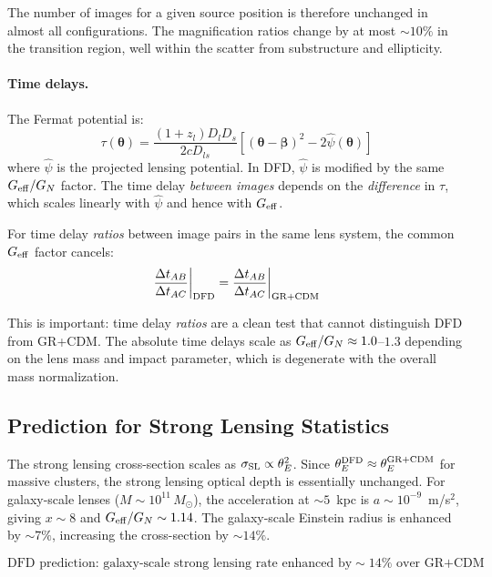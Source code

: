 \documentclass[11pt,a4paper]{article}
\newcommand{\Geff}{G_{\rm eff}}
\begin{document}
The number of images for a given source position is therefore unchanged
in almost all configurations.  The magnification ratios change by at most
$\sim 10\%$ in the transition region, well within the scatter from
substructure and ellipticity.

\paragraph{Time delays.}
The Fermat potential is:
\begin{equation}
\tau(\boldsymbol{\theta}) = \frac{(1+z_l)D_l D_s}{2c D_{ls}}
\left[(\boldsymbol{\theta} - \boldsymbol{\beta})^2
- 2\hat\psi(\boldsymbol{\theta})\right]
\end{equation}
where $\hat\psi$ is the projected lensing potential.  In DFD, $\hat\psi$
is modified by the same $\Geff/G_N$ factor.  The time delay \emph{between
images} depends on the \emph{difference} in $\tau$, which scales linearly
with $\hat\psi$ and hence with $\Geff$.

For time delay \emph{ratios} between image pairs in the same lens system,
the common $\Geff$ factor cancels:
\begin{equation}
\frac{\Delta t_{AB}}{\Delta t_{AC}}\bigg|_{\rm DFD}
= \frac{\Delta t_{AB}}{\Delta t_{AC}}\bigg|_{\rm GR+CDM}
\end{equation}

This is important: time delay \emph{ratios} are a clean test that cannot
distinguish DFD from GR+CDM.  The absolute time delays scale as
$\Geff/G_N \approx 1.0$--$1.3$ depending on the lens mass and impact
parameter, which is degenerate with the overall mass normalization.

\subsection{Prediction for Strong Lensing Statistics}

The strong lensing cross-section scales as $\sigma_{\rm SL} \propto
\theta_E^2$.  Since $\theta_E^{\rm DFD} \approx \theta_E^{\rm GR+CDM}$
for massive clusters, the strong lensing optical depth is essentially
unchanged.  For galaxy-scale lenses ($M \sim 10^{11}\,M_\odot$),
the acceleration at $\sim 5$~kpc is $a \sim 10^{-9}$~m/s$^2$, giving
$x \sim 8$ and $\Geff/G_N \sim 1.14$.  The galaxy-scale Einstein radius
is enhanced by $\sim 7\%$, increasing the cross-section by $\sim 14\%$.

\begin{equation}
\boxed{
\text{DFD prediction: galaxy-scale strong lensing rate enhanced by}
\sim 14\% \text{ over GR+CDM}
}
\end{equation}
\end{document}
